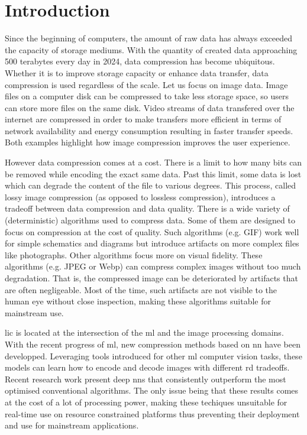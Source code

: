 \chapter*{Introduction}
Since the beginning of computers, the amount of raw data has always exceeded the capacity of storage mediums. With the quantity of created data approaching 500 terabytes every day in 2024, data compression has become ubiquitous. Whether it is to improve storage capacity or enhance data transfer, data compression is used regardless of the scale. Let us focus on image data. Image files on a computer disk can be compressed to take less storage space, so users can store more files on the same disk. Video streams of data transfered over the internet are compressed in order to make transfers more efficient in terms of network availability and energy consumption resulting in faster transfer speeds. Both examples highlight how image compression improves the user experience.

However data compression comes at a cost. There is a limit to how many bits can be removed while encoding the exact same data. Past this limit, some data is lost which can degrade the content of the file to various degrees. This process, called lossy image compression (as opposed to lossless compression), introduces a tradeoff between data compression and data quality. There is a wide variety of (deterministic) algorithms used to compress data. Some of them are designed to focus on compression at the cost of quality. Such algorithms (e.g. GIF) work well for simple schematics and diagrams but introduce artifacts on more complex files like photographs. Other algorithms focus more on visual fidelity. These algorithms (e.g. JPEG or Webp) can compress complex images without too much degradation. That is, the compressed image can be deteriorated by artifacts that are often negligeable. Most of the time, such artifacts are not visible to the human eye without close inspection, making these algorithms suitable for mainstream use.

\acrfull{lic} is located at the intersection of the \acrfull{ml} and the image processing domains. With the recent progress of \acrshort{ml}, new compression methods based on \acrfull{nn} have been developped. Leveraging tools introduced for other \acrshort{ml} computer vision tasks, these models can learn how to encode and decode images with different \acrfull{rd} tradeoffs. Recent research work present deep \acrshort{nn}s that consistently outperform the most optimised conventional algorithms. The only issue being that these results comes at the cost of a lot of processing power, making these techiques unsuitable for real-time use on resource constrained platforms thus preventing their deployment and use for mainstream applications.

